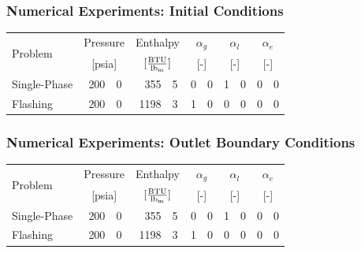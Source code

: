 \documentclass[compress,xcolor=table]{beamer}
\begin{document}
\begin{frame}
\frametitle{Numerical Experiments: Initial Conditions}

\begin{table}[ht]
\centering
\begin{tabular}{@{}lr@{.}lr@{.}lr@{.}lr@{.}lr@{.}l@{}} \toprule
\multirow{2}{*}{Problem} & \multicolumn{2}{c}{Pressure} & \multicolumn{2}{c}{Enthalpy}             & \multicolumn{2}{c}{$\alpha_g$} & \multicolumn{2}{c}{$\alpha_l$} & \multicolumn{2}{c}{$\alpha_e$} \\ 
                         & \multicolumn{2}{c}{[psia]} & \multicolumn{2}{c}{$[\frac{\text{BTU}}{\lbm{}}]$} & \multicolumn{2}{c}{[-]}      & \multicolumn{2}{c}{[-]}      & \multicolumn{2}{c}{[-]}      \\ \midrule
Single-Phase & 200&0  &  355&5 & 0&0 & 1&0 & 0&0 \\
Flashing     & 200&0  & 1198&3 & 1&0 & 0&0 & 0&0 \\ \bottomrule  
\end{tabular}
\label{tab:ic}
\end{table}

\end{frame}
\begin{frame}
\frametitle{Numerical Experiments: Outlet Boundary Conditions}

\begin{table}[ht]
\centering
\begin{tabular}{@{}lr@{.}lr@{.}lr@{.}lr@{.}lr@{.}l@{}} \toprule
\multirow{2}{*}{Problem} & \multicolumn{2}{c}{Pressure} & \multicolumn{2}{c}{Enthalpy}             & \multicolumn{2}{c}{$\alpha_g$} & \multicolumn{2}{c}{$\alpha_l$} & \multicolumn{2}{c}{$\alpha_e$} \\ 
                         & \multicolumn{2}{c}{[psia]} & \multicolumn{2}{c}{$[\frac{\text{BTU}}{\lbm{}}]$} & \multicolumn{2}{c}{[-]}      & \multicolumn{2}{c}{[-]}      & \multicolumn{2}{c}{[-]}      \\ \midrule
Single-Phase & 200&0 &  355&5 & 0&0 & 1&0 & 0&0 \\
Flashing     & 200&0 & 1198&3 & 1&0 & 0&0 & 0&0 \\ \bottomrule  
\end{tabular}
\label{tab:bc_pe}
\end{table}

\end{frame}
\end{document}
